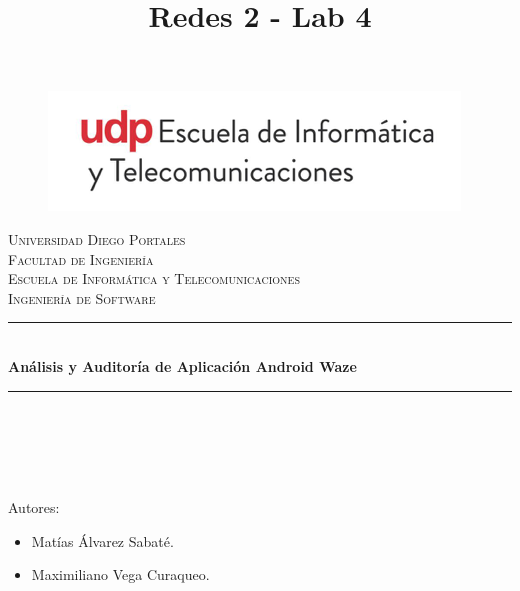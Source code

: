 \documentclass[12pt]{article}
\title{Redes 2 - Lab 4}
\begin{document}
\begin{titlepage}

\newcommand{\HRule}{\rule{\linewidth}{0.5mm}}
\center

\begin{figure}[H]
  \begin{center}
    \includegraphics[scale=0.7]{imagenes/logoUdpEIT.png}
  \end{center}
\end{figure}

\textsc{\LARGE Universidad Diego Portales}\\[0.4cm]
\textsc{\Large Facultad de Ingeniería}\\[0.4cm]
\textsc{\large Escuela de Informática y Telecomunicaciones}\\[0.4cm]
\textsc{\large Ingeniería de Software}\\[0.1cm]
\HRule \\[0.4cm]

{ \huge \bfseries Análisis y Auditoría de Aplicación Android Waze}\\[0.2cm] %
\HRule \\[0.6cm] 
\ \\ \ \\ \ \\ 

\begin{flushleft} \large
Autores:\begin{itemize}
\item Matías Álvarez Sabaté.
\item Maximiliano Vega Curaqueo.



\end{itemize}
\end{flushleft}
~


\vfill %
\end{titlepage}
\end{document}
